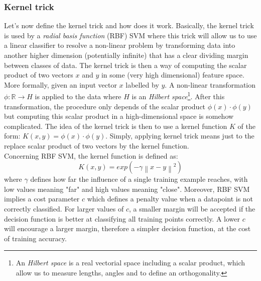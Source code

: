 \documentclass[11pt, openany]{report}
\theoremstyle{plain}
\newcommand\norm[1]{\left\lVert#1\right\rVert}
\theoremstyle{definition}
\theoremstyle{remark}
\begin{document}
\newpage
\subsubsection{Kernel trick}
Let's now define the kernel trick and how does it work. Basically, the kernel trick is used by a \textit{radial basis function} (RBF) SVM where this trick will allow us to use a linear classifier to resolve a non-linear problem by transforming data into another higher dimension (potentially infinite) that has a clear dividing margin between classes of data. The kernel trick is then a way of computing the scalar product of two vectors $x$ and $y$ in some (very high dimensional) feature space. \\

More formally, given an input vector $x$ labelled by $y$. A non-linear transformation $\phi : \mathbb{R} \rightarrow H$ is applied to the data where $H$ is an \textit{Hilbert space}\footnote{An \textit{Hilbert space} is a real vectorial space including a scalar product, which allow us to measure lengths, angles and to define an orthogonality.}. After this transformation, the procedure only depends of the scalar product $\phi(x) \cdot \phi(y)$  but computing this scalar product in a high-dimensional space is somehow complicated. The idea of the kernel trick is then to use a kernel function $K$ of the form: $K(x,y) = \phi(x) \cdot \phi(y)$. Simply, applying kernel trick means just to the replace scalar product of two vectors by the kernel function.\\ 
       

Concerning RBF SVM, the kernel function is defined as: 
$$ K(x,y) = exp( - \gamma \norm{x-y}^2 ) $$
where $\gamma$ defines how far the influence of a single training example reaches, with low values meaning "far" and high values meaning "close". Moreover, RBF SVM implies a cost  parameter $c$ which defines a penalty value when a datapoint is not correctly classified. For larger values of $c$, a smaller margin will be accepted if the decision function is better at classifying all training points correctly. A lower $c$ will encourage a larger margin, therefore a simpler decision function, at the cost of training accuracy. 
\end{document}
